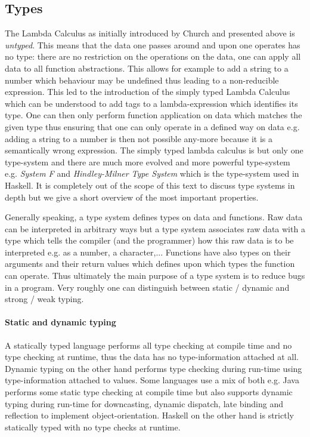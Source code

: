 \subsection{Types}
The Lambda Calculus as initially introduced by Church and presented above is \textit{untyped}. This means that the data one passes around and upon one operates has no type: there are no restriction on the operations on the data, one can apply all data to all function abstractions. This allows for example to add a string to a number which behaviour may be undefined thus leading to a non-reducible expression.
This led to the introduction of the simply typed Lambda Calculus which can be understood to add tags to a lambda-expression which identifies its type. One can then only perform function application on data which matches the given type thus ensuring that one can only operate in a defined way on data e.g. adding a string to a number is then not possible any-more because it is a semantically wrong expression.
The simply typed lambda calculus is but only one type-system and there are much more evolved and more powerful type-system e.g. \textit{System F} and \textit{Hindley-Milner Type System} which is the type-system used in Haskell. It is completely out of the scope of this text to discuss type systems in depth but we give a short overview of the most important properties.

Generally speaking, a type system defines types on data and functions. Raw data can be interpreted in arbitrary ways but a type system associates raw data with a type which tells the compiler (and the programmer) how this raw data is to be interpreted e.g. as a number, a character,... Functions have also types on their arguments and their return values which defines upon which types the function can operate. Thus ultimately the main purpose of a type system is to reduce bugs in a program. Very roughly one can distinguish between static / dynamic and strong / weak typing.

\paragraph{Static and dynamic typing}
A statically typed language performs all type checking at compile time and no type checking at runtime, thus the data has no type-information attached at all. Dynamic typing on the other hand performs type checking during run-time using type-information attached to values. Some languages use a mix of both e.g. Java performs some static type checking at compile time but also supports dynamic typing during run-time for downcasting, dynamic dispatch, late binding and reflection to implement object-orientation. Haskell on the other hand is strictly statically typed with no type checks at runtime.

